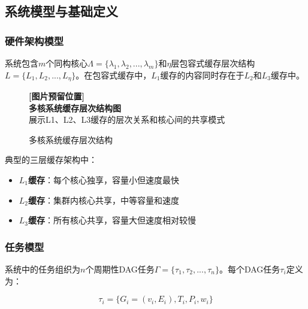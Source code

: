 \subsection{系统模型与基础定义}

\subsubsection{硬件架构模型}

系统包含$m$个同构核心$\Lambda = \{\lambda_1, \lambda_2, ..., \lambda_m\}$和$\eta$层包容式缓存层次结构$L = \{L_1, L_2, ..., L_\eta\}$。在包容式缓存中，$L_1$缓存的内容同时存在于$L_2$和$L_3$缓存中。

\begin{figure}[htbp]
\centering
\begin{tcolorbox}[
    colback=gray!10,
    colframe=gray!50,
    width=0.9\textwidth,
    center,
    arc=3pt
]
\centering
\textbf{[图片预留位置]}\\
\textbf{多核系统缓存层次结构图}\\
\footnotesize{展示L1、L2、L3缓存的层次关系和核心间的共享模式}
\end{tcolorbox}
\caption{多核系统缓存层次结构}
\label{fig:cache_hierarchy}
\end{figure}

典型的三层缓存架构中：
\begin{tcolorbox}[
    colback=yellow!10!white,
    colframe=orange!50!black,
    arc=3pt,
    left=5pt,
    right=5pt
]
\begin{itemize}    \item \textbf{$L_1$缓存}：每个核心独享，容量小但速度最快
    \item \textbf{$L_2$缓存}：集群内核心共享，中等容量和速度
    \item \textbf{$L_3$缓存}：所有核心共享，容量大但速度相对较慢
\end{itemize}
\end{tcolorbox}

\subsubsection{任务模型}

系统中的任务组织为$n$个周期性DAG任务$\Gamma = \{\tau_1, \tau_2, ..., \tau_n\}$。每个DAG任务$\tau_i$定义为：

\begin{tcolorbox}[
    colback=blue!5!white,
    colframe=blue!50!black,
    arc=3pt,
    center
]
$$\tau_i = \{G_i = (v_i, E_i), T_i, P_i, w_i\}$$
\end{tcolorbox}

